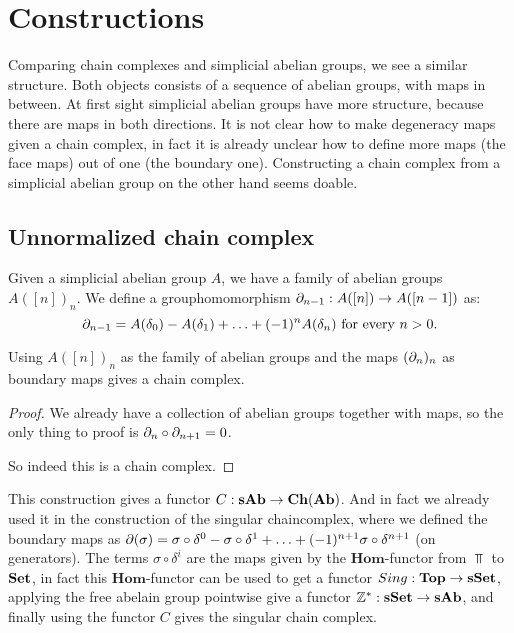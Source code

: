 \section{Constructions}
\label{sec:Constructions}

Comparing chain complexes and simplicial abelian groups, we see a similar structure. Both objects consists of a sequence of abelian groups, with maps in between. At first sight simplicial abelian groups have more structure, because there are maps in both directions. It is not clear how to make degeneracy maps given a chain complex, in fact it is already unclear how to define more maps (the face maps) out of one (the boundary one). Constructing a chain complex from a simplicial abelian group on the other hand seems doable.

\subsection{Unnormalized chain complex}
Given a simplicial abelian group $A$, we have a family of abelian groups $A([n])_n$. We define a grouphomomorphism $\partial_{n-1} : A([n]) \to A([n-1])$ as:
$$\partial_{n-1} = A(\delta_0) - A(\delta_1) + \ldots + (-1)^n A(\delta_n) \text{ for every } n > 0.$$
\begin{lemma}
	Using $A([n])_n$ as the family of abelian groups and the maps $(\partial_n)_n$ as boundary maps gives a chain complex.
\end{lemma}
\begin{proof}
	We already have a collection of abelian groups together with maps, so the only thing to proof is $\partial_n \circ \partial_{n+1} = 0$.


	So indeed this is a chain complex.
\end{proof}

This construction gives a functor $C : \mathbf{sAb} \to \mathbf{Ch}(\mathbf{Ab})$. And in fact we already used it in the construction of the singular chaincomplex, where we defined the boundary maps as $\partial(\sigma) = \sigma \circ \delta^0 - \sigma \circ \delta^1 + \ldots + (-1)^{n+1} \sigma \circ \delta^{n+1}$ (on generators). The terms $\sigma \circ \delta^i$ are the maps given by the $\mathbf{Hom}$-functor from $\Top$ to $\mathbf{Set}$, in fact this $\mathbf{Hom}$-functor can be used to get a functor $Sing : \mathbf{Top} \to \mathbf{sSet}$, applying the free abelain group pointwise give a functor $\mathbb{Z}^\ast : \mathbf{sSet} \to \mathbf{sAb}$, and finally using the functor $C$ gives the singular chain complex.


